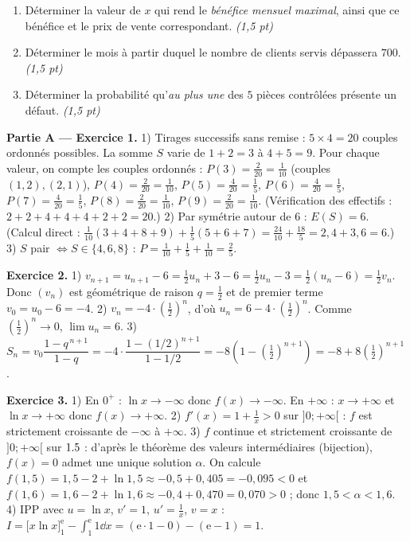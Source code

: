 \begin{enumerate}[label=\textbf{Tâche \arabic*.},leftmargin=2.4em]
\item Déterminer la valeur de $x$ qui rend le \emph{bénéfice mensuel maximal}, ainsi que ce
bénéfice et le prix de vente correspondant. \hfill\textit{(1,5 pt)}
\item Déterminer le mois à partir duquel le nombre de clients servis dépassera $700$. \hfill\textit{(1,5 pt)}
\item Déterminer la probabilité qu'\emph{au plus une} des $5$ pièces contrôlées présente un défaut. \hfill\textit{(1,5 pt)}
\end{enumerate}
\par{}


\noindent\textbf{Partie A — Exercice 1.}
1) Tirages successifs sans remise : $5\times4=20$ couples ordonnés possibles. La somme $S$ varie
de $1+2=3$ à $4+5=9$. Pour chaque valeur, on compte les couples ordonnés :
$P(3)=\frac{2}{20}=\frac1{10}$ (couples $(1,2),(2,1)$),
$P(4)=\frac2{20}=\frac1{10}$,
$P(5)=\frac4{20}=\frac15$,
$P(6)=\frac4{20}=\frac15$,
$P(7)=\frac4{20}=\frac15$,
$P(8)=\frac2{20}=\frac1{10}$,
$P(9)=\frac2{20}=\frac1{10}$. (Vérification des effectifs : $2{+}2{+}4{+}4{+}4{+}2{+}2=20$.)
2) Par symétrie autour de $6$ : $E(S)=6$. (Calcul direct :
$\frac1{10}(3{+}4{+}8{+}9)+\frac15(5{+}6{+}7)=\frac{24}{10}+\frac{18}{5}=2{,}4+3{,}6=6$.)
3) $S$ pair $\iff S\in\{4,6,8\}$ : $P=\frac1{10}+\frac15+\frac1{10}=\frac25$.

\noindent\textbf{Exercice 2.}
1) $v_{n+1}=u_{n+1}-6=\frac12u_n+3-6=\frac12u_n-3=\frac12(u_n-6)=\frac12 v_n$. Donc $(v_n)$ est
géométrique de raison $q=\frac12$ et de premier terme $v_0=u_0-6=-4$.
2) $v_n=-4\cdot\left(\frac12\right)^n$, d'où $u_n=6-4\cdot\left(\frac12\right)^n$. Comme $\left(\frac12\right)^n\to0$, $\lim u_n=6$.
3) $S_n=v_0\dfrac{1-q^{\,n+1}}{1-q}=-4\cdot\dfrac{1-(1/2)^{n+1}}{1-1/2}=-8\left(1-\left(\tfrac12\right)^{n+1}\right)=-8+8\left(\tfrac12\right)^{n+1}$.

\noindent\textbf{Exercice 3.}
1) En $0^+$ : $\ln x\to-\infty$ donc $f(x)\to-\infty$. En $+\infty$ : $x\to+\infty$ et $\ln x\to+\infty$ donc $f(x)\to+\infty$.
2) $f'(x)=1+\frac1x>0$ sur $]0;+\infty[$ : $f$ est strictement croissante de $-\infty$ à $+\infty$.
3) $f$ continue et strictement croissante de $]0;+\infty[$ sur $1.5$ : d'après le théorème des
valeurs intermédiaires (bijection), $f(x)=0$ admet une unique solution $\alpha$. On calcule
$f(1{,}5)=1{,}5-2+\ln 1{,}5\approx-0{,}5+0{,}405=-0{,}095<0$ et
$f(1{,}6)=1{,}6-2+\ln 1{,}6\approx-0{,}4+0{,}470=0{,}070>0$ ; donc $1{,}5<\alpha<1{,}6$.
4) IPP avec $u=\ln x$, $v'=1$, $u'=\frac1x$, $v=x$ :
$I=\big[x\ln x\big]_1^{\mathrm e}-\int_1^{\mathrm e}1\dd x=(\mathrm e\cdot1-0)-(\mathrm e-1)=1$.


